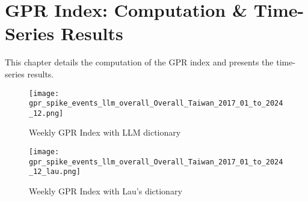 
\chapter{GPR Index: Computation \& Time-Series Results}

This chapter details the computation of the GPR index and presents the time-series results.

\begin{figure}[htbp]
  \centering
  \texttt{[image: gpr\_spike\_events\_llm\_overall\_Overall\_Taiwan\_2017\_01\_to\_2024\_12.png]}
  \caption{Weekly GPR Index with LLM dictionary}
  \label{fig:my_example}
\end{figure}

\begin{figure}[htbp]
  \centering
  \texttt{[image: gpr\_spike\_events\_llm\_overall\_Overall\_Taiwan\_2017\_01\_to\_2024\_12\_lau.png]}
  \caption{Weekly GPR Index with Lau's dictionary}
  \label{fig:my_example}
\end{figure}
